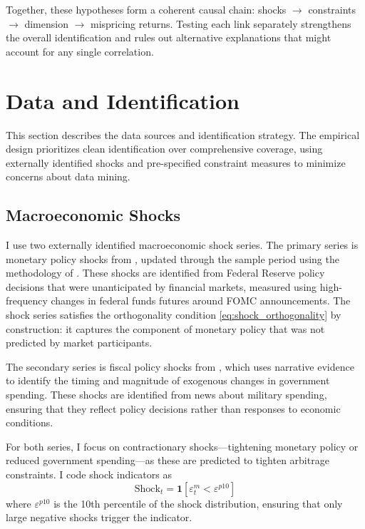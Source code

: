 \documentclass[12pt,letterpaper]{article}
\theoremstyle{plain}
\theoremstyle{definition}
\begin{document}
Together, these hypotheses form a coherent causal chain: shocks $\to$ constraints $\to$ dimension $\to$ mispricing returns. Testing each link separately strengthens the overall identification and rules out alternative explanations that might account for any single correlation.


\section{Data and Identification}\label{sec:data}

This section describes the data sources and identification strategy. The empirical design prioritizes clean identification over comprehensive coverage, using externally identified shocks and pre-specified constraint measures to minimize concerns about data mining.

\subsection{Macroeconomic Shocks}\label{subsec:shock_data}

I use two externally identified macroeconomic shock series. The primary series is monetary policy shocks from \cite{romer2004new}, updated through the sample period using the methodology of \cite{nakamura2018high}. These shocks are identified from Federal Reserve policy decisions that were unanticipated by financial markets, measured using high-frequency changes in federal funds futures around FOMC announcements. The shock series satisfies the orthogonality condition \eqref{eq:shock_orthogonality} by construction: it captures the component of monetary policy that was not predicted by market participants.

The secondary series is fiscal policy shocks from \cite{ramey2011identifying}, which uses narrative evidence to identify the timing and magnitude of exogenous changes in government spending. These shocks are identified from news about military spending, ensuring that they reflect policy decisions rather than responses to economic conditions.

For both series, I focus on contractionary shocks---tightening monetary policy or reduced government spending---as these are predicted to tighten arbitrage constraints. I code shock indicators as
\begin{equation}\label{eq:shock_indicator}
\text{Shock}_t = \mathbf{1}[\varepsilon_t^m < \varepsilon^{p10}]
\end{equation}
where $\varepsilon^{p10}$ is the 10th percentile of the shock distribution, ensuring that only large negative shocks trigger the indicator.
\end{document}
